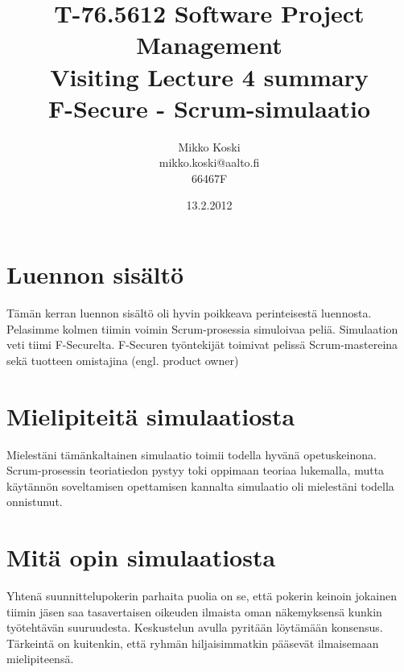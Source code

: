 \documentclass[a4paper]{article}
\begin{document}
\title{\small T-76.5612 Software Project Management \\ Visiting Lecture 4 summary \\ \huge F-Secure - Scrum-simulaatio}
\date{13.2.2012}
\author{Mikko Koski \\ mikko.koski@aalto.fi \\ 66467F}
\maketitle

\normalsize


\section{Luennon sisältö}

Tämän kerran luennon sisältö oli hyvin poikkeava perinteisestä luennosta. Pelasimme kolmen tiimin voimin Scrum-prosessia simuloivaa peliä. Simulaation veti tiimi F-Securelta. F-Securen työntekijät toimivat pelissä Scrum-mastereina sekä tuotteen omistajina (engl. product owner)

\section{Mielipiteitä simulaatiosta}

Mielestäni tämänkaltainen simulaatio toimii todella hyvänä opetuskeinona. Scrum-prosessin teoriatiedon pystyy toki oppimaan teoriaa lukemalla, mutta käytännön soveltamisen opettamisen kannalta simulaatio oli mielestäni todella onnistunut.

\section{Mitä opin simulaatiosta}

Yhtenä suunnittelupokerin parhaita puolia on se, että pokerin keinoin jokainen tiimin jäsen saa tasavertaisen oikeuden ilmaista oman näkemyksensä kunkin työtehtävän suuruudesta. Keskustelun avulla pyritään löytämään konsensus. Tärkeintä on kuitenkin, että ryhmän hiljaisimmatkin pääsevät ilmaisemaan mielipiteensä.
\end{document}
